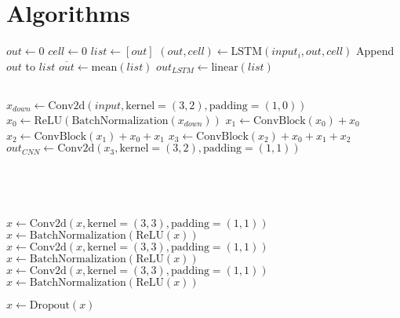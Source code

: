 \chapter{Algorithms}

\begin{center}

 \label{algo:CNNLSTM}
\begin{algorithmic}[1]
	\State $out \gets 0$ 
	\State $cell \gets 0$
	\State $list \gets [out]$
	 
		\State $(out, cell) \gets \textrm{LSTM}(input_i, out, cell)$
		\State Append $out$ to $list$
	\EndFor
	\State $\overline{out} \gets \textrm{mean}(list)$ 
	\State $out_{LSTM} \gets \textrm{linear}(list)$ 
	
	\\
	
	\State $x_{down} \gets \textrm{Conv2d}(input, \textrm{kernel}=(3,2), \textrm{padding}=(1,0))$ 
	\State $x_0 \gets \textrm{ReLU}(\textrm{BatchNormalization}(x_{down}))$
	\State $x_1 \gets \textrm{ConvBlock}(x_0) + x_0$ 
	\State $x_2 \gets \textrm{ConvBlock}(x_1) + x_0 + x_1$
	\State $x_3 \gets \textrm{ConvBlock}(x_2) + x_0 + x_1 + x_2$
	\State $out_{CNN} \gets \textrm{Conv2d}(x_3, \textrm{kernel}=(3,2), \textrm{padding}=(1,1))$ 
	
	\\
	
	\State {}
	
	\EndProcedure
	
	\\
	
	
	
	\State $x \gets \textrm{Conv2d}(x, \textrm{kernel}=(3,3), \textrm{padding}=(1,1))$ 
	\State $x \gets \textrm{BatchNormalization}(\textrm{ReLU}(x))$
	\State $x \gets \textrm{Conv2d}(x, \textrm{kernel}=(3,3), \textrm{padding}=(1,1))$
	\State $x \gets \textrm{BatchNormalization}(\textrm{ReLU}(x))$
	\State $x \gets \textrm{Conv2d}(x, \textrm{kernel}=(3,3), \textrm{padding}=(1,1))$
	\State $x \gets \textrm{BatchNormalization}(\textrm{ReLU}(x))$
	
	\State $x \gets \textrm{Dropout}(x)$
	
	\State {}
	
	\EndProcedure
\end{algorithmic}
\end{center}




